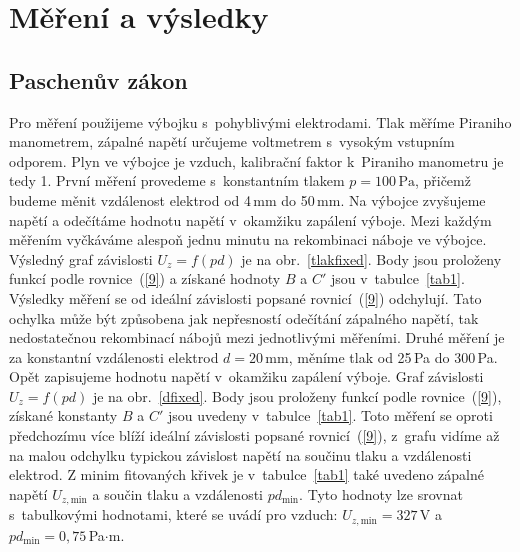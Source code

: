 \documentclass[a4paper,12pt]{article}
\begin{document}
\section{Měření a výsledky}
\subsection{Paschenův zákon}
Pro měření použijeme výbojku s~pohyblivými elektrodami. Tlak měříme Piraniho 
manometrem, zápalné napětí určujeme voltmetrem s~vysokým vstupním odporem. Plyn 
ve výbojce je vzduch, kalibrační faktor k~Piraniho manometru je tedy 1. První 
měření provedeme s~konstantním tlakem $p = 100\,\si{\pascal}$, přičemž budeme 
měnit vzdálenost elektrod od 4\,\si{\milli\meter} do 50\,\si{\milli\meter}. Na 
výbojce zvyšujeme napětí a odečítáme hodnotu napětí v~okamžiku zapálení výboje. 
Mezi každým měřením vyčkáváme alespoň jednu minutu na rekombinaci náboje ve 
výbojce. Výsledný graf závislosti $U_z = f(pd)$ je na obr.~\ref{tlakfixed}. 
Body jsou proloženy funkcí podle rovnice~(\ref{9}) a získané hodnoty $B$ 
a $C'$ jsou v~tabulce~\ref{tab1}. Výsledky měření se od ideální závislosti 
popsané 
rovnicí~(\ref{9}) odchylují. Tato ochylka může být způsobena jak 
nepřesností odečítání zápalného napětí, tak nedostatečnou rekombinací nábojů 
mezi jednotlivými měřeními. 
Druhé měření je za konstantní vzdálenosti elektrod $d = 20\,\si{\milli\meter}$, 
měníme tlak od 25\,\si{\pascal} do 300\,\si{\pascal}. Opět zapisujeme hodnotu 
napětí v~okamžiku zapálení výboje. Graf závislosti $U_z = f(pd)$ je na 
obr.~\ref{dfixed}. Body jsou proloženy funkcí podle rovnice~(\ref{9}), získané 
konstanty 
$B$ a $C'$ jsou uvedeny v~tabulce~\ref{tab1}. Toto měření se oproti 
předchozímu více 
blíží ideální závislosti popsané rovnicí~(\ref{9}), z~grafu vidíme až na malou 
odchylku typickou závislost napětí na součinu tlaku a vzdálenosti elektrod.
Z minim fitovaných křivek je v~tabulce~\ref{tab1} také uvedeno zápalné napětí 
$U_{z,\text{min}}$ a 
součin tlaku a vzdálenosti $pd_{\text{min}}$. Tyto hodnoty 
lze srovnat s~tabulkovými hodnotami, které se uvádí pro vzduch: 
$U_{z,\text{min}} = 327$\,V a $pd_{\text{min}} = 0,75$\,Pa$\cdot$m.
\end{document}
